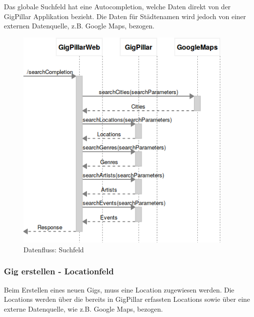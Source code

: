 Das globale Suchfeld hat eine Autocompletion, welche Daten direkt von
der GigPillar Applikation bezieht. Die Daten für Städtenamen wird jedoch von
einer externen Datenquelle, z.B. Google Maps, bezogen.

%

\begin{figure}[!htb]
  \centering
  \includegraphics[width=0.95\textwidth]{konzept/datenfluss-suchfeld.png}
  \caption{Datenfluss: Suchfeld}
\end{figure}

\clearpage
\subsubsection{Gig erstellen - Locationfeld}\label{datenfluss-gig-erstellen-locationfeld}

Beim Erstellen eines neuen Gigs, muss eine Location zugewiesen werden. Die
Locations werden über die bereits in GigPillar erfassten Locations sowie über
eine externe Datenquelle, wie z.B. Google Maps, bezogen.

